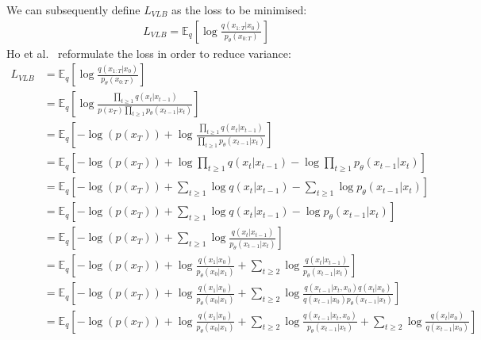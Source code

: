 \documentclass[twoside]{article}
\numberwithin{equation}{section}
\numberwithin{figure}{section}
\begin{document}
We can subsequently define $L_{VLB}$ as the loss to be minimised:
\begin{gather}
  L_{VLB} = \mathbb{E}_q \left[\log \frac{q\left(x_{1:T}|x_0\right)}{p_{\theta}\left(x_{0:T}\right)}\right] 
\end{gather}
Ho et al.~\cite{ho2020denoising} reformulate the loss in order to reduce variance:
\begin{align}
  L_{VLB} &= \mathbb{E}_q \left[\log \frac{q\left(x_{1:T}|x_0\right)}{p_{\theta}\left(x_{0:T}\right)}\right] \\
  &= \mathbb{E}_q \left[\log \frac{\prod_{t \geq 1} q\left(x_t | x_{t-1}\right)}{p \left(x_T\right) \prod_{t \geq 1} p_{\theta}\left(x_{t-1} | x_t\right)}\right] \\
  &= \mathbb{E}_q \left[-\log\left(p \left(x_T\right)\right) + \log \frac{\prod_{t \geq 1} q\left(x_t | x_{t-1}\right)}{\prod_{t \geq 1} p_{\theta}\left(x_{t-1} | x_t\right)}\right] \\
  &= \mathbb{E}_q \left[-\log\left(p \left(x_T\right)\right) + \log \prod_{t \geq 1} q\left(x_t | x_{t-1}\right) - \log \prod_{t \geq 1} p_{\theta}\left(x_{t-1} | x_t\right)\right] \\
  &= \mathbb{E}_q \left[-\log\left(p \left(x_T\right)\right) + \sum_{t \geq 1} \log q\left(x_t | x_{t-1}\right) - \sum_{t \geq 1} \log p_{\theta}\left(x_{t-1} | x_t\right)\right] \\
  &= \mathbb{E}_q \left[-\log\left(p \left(x_T\right)\right) + \sum_{t \geq 1} \log q\left(x_t | x_{t-1}\right) - \log p_{\theta}\left(x_{t-1} | x_t\right)\right] \\
  &= \mathbb{E}_q \left[-\log\left(p \left(x_T\right)\right) + \sum_{t \geq 1} \log \frac{q\left(x_t | x_{t-1}\right)}{p_{\theta}\left(x_{t-1} | x_t\right)}\right] \\
  &= \mathbb{E}_q \left[-\log\left(p \left(x_T\right)\right) + \log \frac{q\left(x_1 | x_0\right)}{p_{\theta}\left(x_0 | x_1\right)} + \sum_{t \geq 2} \log \frac{q\left(x_t | x_{t-1}\right)}{p_{\theta}\left(x_{t-1} | x_t\right)}\right] \\
  &= \mathbb{E}_q \left[-\log\left(p \left(x_T\right)\right) + \log \frac{q\left(x_1 | x_0\right)}{p_{\theta}\left(x_0 | x_1\right)} + \sum_{t \geq 2} \log \frac{q\left(x_{t-1} | x_t, x_0\right) q\left(x_t | x_0\right)}{{q\left(x_{t-1} | x_0\right)} p_{\theta}\left(x_{t-1} | x_t\right)}\right] \label{eq:conditionedq}\\
  &= \mathbb{E}_q \left[-\log\left(p \left(x_T\right)\right) + \log \frac{q\left(x_1 | x_0\right)}{p_{\theta}\left(x_0 | x_1\right)} + \sum_{t \geq 2} \log \frac{q\left(x_{t-1} | x_t, x_0\right)}{p_{\theta}\left(x_{t-1} | x_t\right)} + \sum_{t \geq 2} \log \frac{q\left(x_t | x_0\right)}{q\left(x_{t-1} | x_0\right)}\right] \\

\end{align}
\end{document}
